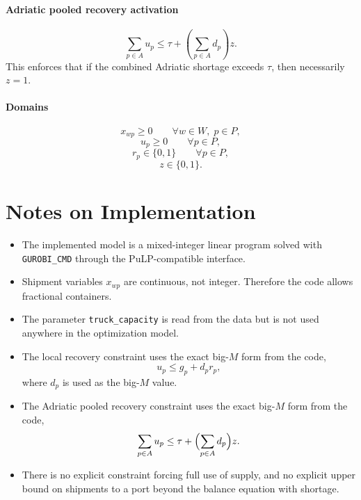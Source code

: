 \paragraph{Adriatic pooled recovery activation}
\[
\sum_{p \in A} u_p \le \tau + \left(\sum_{p \in A} d_p\right) z.
\]
This enforces that if the combined Adriatic shortage exceeds $\tau$, then necessarily $z=1$.

\paragraph{Domains}
\[
x_{wp} \ge 0 \qquad \forall w \in W,\; p \in P,
\]
\[
u_p \ge 0 \qquad \forall p \in P,
\]
\[
r_p \in \{0,1\} \qquad \forall p \in P,
\]
\[
z \in \{0,1\}.
\]

\section*{Notes on Implementation}

\begin{itemize}
    \item The implemented model is a mixed-integer linear program solved with \texttt{GUROBI\_CMD} through the PuLP-compatible interface.
    \item Shipment variables $x_{wp}$ are continuous, not integer. Therefore the code allows fractional containers.
    \item The parameter \texttt{truck\_capacity} is read from the data but is not used anywhere in the optimization model.
    \item The local recovery constraint uses the exact big-$M$ form from the code,
    \[
    u_p \le g_p + d_p r_p,
    \]
    where $d_p$ is used as the big-$M$ value.
    \item The Adriatic pooled recovery constraint uses the exact big-$M$ form from the code,
    \[
    \sum_{p \in A} u_p \le \tau + \Bigl(\sum_{p \in A} d_p\Bigr) z.
    \]
    \item There is no explicit constraint forcing full use of supply, and no explicit upper bound on shipments to a port beyond the balance equation with shortage.
\end{itemize}
